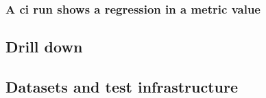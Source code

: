 \subsubsection{A \gls{ci} run shows a regression in a \gls{metric value}}



\subsection{Drill down}
\label{sec:design:drill}




\subsection{Datasets and test infrastructure}
\label{sec:design:test}

